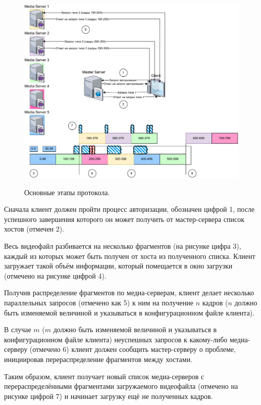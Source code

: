\begin{figure}[h]
	\begin{center}
		{\includegraphics[scale = 0.8]{img/[all process].pdf}}
		\caption{Основные этапы протокола.}
		\label{image:general_process}
	\end{center}
\end{figure}

\pagebreak

Сначала клиент должен пройти процесс авторизации, обозначен цифрой 1, после успешного завершения которого он может получить от мастер-сервера список хостов (отмечен 2). 

Весь видеофайл разбивается на несколько фрагментов (на рисунке цифра 3), каждый из которых может быть получен от хоста из полученного списка. Клиент загружает такой объём информации, который помещается в окно загрузки (отмечено на рисунке цифрой 4). 

Получив распределение фрагментов по медиа-серверам, клиент делает несколько параллельных запросов (отмечено как 5) к ним на получение $n$ кадров ($n$ должно быть изменяемой величиной и указываться в конфигурационном файле клиента).

В случае $m$ ($m$ должно быть изменяемой величиной и указываться в конфигурационном файле клиента) неуспешных запросов к какому-либо медиа-серверу (отмечено 6) клиент должен сообщить мастер-серверу о проблеме, инициировав перераспределение фрагментов между хостами. 

Таким образом, клиент получает новый список медиа-серверов с перераспределёнными фрагментами загружаемого видеофайла (отмечено на рисунке цифрой 7) и начинает загрузку ещё не полученных кадров. 

